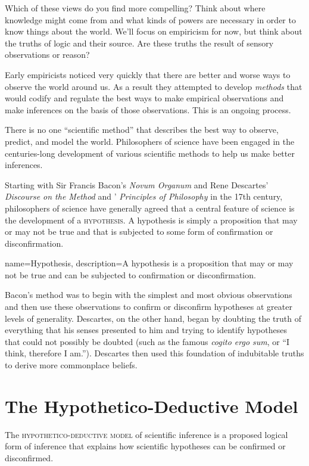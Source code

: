 Which of these views do you find more compelling? Think about where knowledge might come from and what kinds of powers are necessary in order to know things about the world. We'll focus on empiricism for now, but think about the truths of logic and their source. Are these truths the result of sensory observations or reason?

Early empiricists noticed very quickly that there are better and worse ways to observe the world around us. As a result they attempted to develop \emph{methods} that would codify and regulate the best ways to make empirical observations and make inferences on the basis of those observations. This is an ongoing process.

There is no one ``scientific method'' that describes the best way to observe, predict, and model the world. Philosophers of science have been engaged in the centuries-long development of various scientific methods to help us make better inferences. 

Starting with Sir Francis Bacon's \textit{Novum Organum} and Rene Descartes' \textit{Discourse on the Method} and ' \textit{Principles of Philosophy} in the 17th century, philosophers of science have generally agreed that a central feature of science is the development of a \textsc{\gls{hypothesis}}. A hypothesis is simply a proposition that may or may not be true and that is subjected to some form of confirmation or disconfirmation.


{
name=Hypothesis,
description={A hypothesis is a proposition that may or may not be true and can be subjected to confirmation or disconfirmation.}
}


Bacon's method was to begin with the simplest and most obvious observations and then use these observations to confirm or disconfirm hypotheses at greater levels of generality. Descartes, on the other hand, began by doubting the truth of everything that his senses presented to him and trying to identify hypotheses that could not possibly be doubted (such as the famous \emph{cogito ergo sum}, or ``I think, therefore I am.''). Descartes then used this foundation of indubitable truths to derive more commonplace beliefs.

\section{The Hypothetico-Deductive Model}

The \textsc{\gls{hypothetico-deductive model}} of scientific inference is a proposed logical form of inference that explains how scientific hypotheses can be confirmed or disconfirmed.

